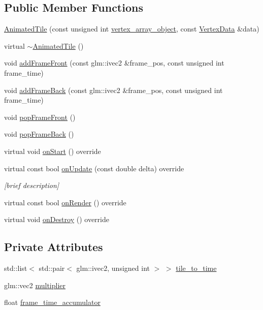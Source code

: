 \subsection*{Public Member Functions}
\begin{DoxyCompactItemize}
\item 
\hyperlink{class_graphics_1_1_animated_tile_a2845baac8df3cd5ceda7226d8c1da83a}{Animated\+Tile} (const unsigned int \hyperlink{class_graphics_1_1_renderable_aabfa91ebff7b10decd54119d663044ef}{vertex\+\_\+array\+\_\+object}, const \hyperlink{class_graphics_1_1_vertex_data}{Vertex\+Data} \&data)
\item 
virtual \hyperlink{class_graphics_1_1_animated_tile_a914ca23734bc692a35db7b1217418ef9}{$\sim$\+Animated\+Tile} ()
\item 
void \hyperlink{class_graphics_1_1_animated_tile_a7d4f7572d383943f06c81c86f87e06a2}{add\+Frame\+Front} (const glm\+::ivec2 \&frame\+\_\+pos, const unsigned int frame\+\_\+time)
\item 
void \hyperlink{class_graphics_1_1_animated_tile_a3b10e46f8f35a03e2c338cc20f9b7bd0}{add\+Frame\+Back} (const glm\+::ivec2 \&frame\+\_\+pos, const unsigned int frame\+\_\+time)
\item 
void \hyperlink{class_graphics_1_1_animated_tile_a92ab2aabe27674c38e7e7a31fd9b331e}{pop\+Frame\+Front} ()
\item 
void \hyperlink{class_graphics_1_1_animated_tile_a820c1aca5a701a43e50bdfbfe7324619}{pop\+Frame\+Back} ()
\item 
virtual void \hyperlink{class_graphics_1_1_animated_tile_ad82e39321244cc2e06ee3df527473aba}{on\+Start} () override
\item 
virtual const bool \hyperlink{class_graphics_1_1_animated_tile_a2c6f7cd3866cad84b73ea5da8b92b76e}{on\+Update} (const double delta) override
\begin{DoxyCompactList}\small\item\em \mbox{[}brief description\mbox{]} \end{DoxyCompactList}\item 
virtual const bool \hyperlink{class_graphics_1_1_animated_tile_a0b414dfdb18e4647652f8bb9334f9eee}{on\+Render} () override
\item 
virtual void \hyperlink{class_graphics_1_1_animated_tile_a9781b9b256a666a123fd2c050adb5118}{on\+Destroy} () override
\end{DoxyCompactItemize}
\subsection*{Private Attributes}
\begin{DoxyCompactItemize}
\item 
std\+::list$<$ std\+::pair$<$ glm\+::ivec2, unsigned int $>$ $>$ \hyperlink{class_graphics_1_1_animated_tile_a4d02a9bdd7576d1228b9ddf3eadec65c}{tile\+\_\+to\+\_\+time}
\item 
glm\+::vec2 \hyperlink{class_graphics_1_1_animated_tile_a6ceae6448ee26d0cd1b489795c55eb22}{multiplier}
\item 
float \hyperlink{class_graphics_1_1_animated_tile_a77a84617edf89f6b1576d4745bdd5d13}{frame\+\_\+time\+\_\+accumulator}
\end{DoxyCompactItemize}
